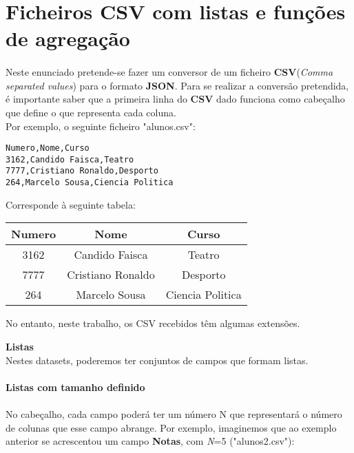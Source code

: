 \documentclass[11pt,a4paper]{report}
\begin{document}
    \section{Ficheiros CSV com listas e funções de agregação}
    \paragraph{}
    Neste enunciado pretende-se fazer um conversor de um ficheiro \textbf{CSV}(\textit{Comma separated values}) para o formato \textbf{JSON}. Para se realizar a conversão pretendida, é importante saber que a primeira linha do \textbf{CSV} dado funciona como cabeçalho que define o que representa cada coluna.\\
    Por exemplo, o seguinte ficheiro "alunos.csv":
    \begin{lstlisting}[]
Numero,Nome,Curso
3162,Candido Faisca,Teatro
7777,Cristiano Ronaldo,Desporto
264,Marcelo Sousa,Ciencia Politica
    \end{lstlisting}
    Corresponde à seguinte tabela:
\begin{center}
    \begin{tabular}{||c c c||} 
    \hline
    Numero & Nome & Curso \\ [0.5ex] 
    \hline
    3162 & Candido Faisca & Teatro \\ 
    \hline
    7777 & Cristiano Ronaldo & Desporto \\
    \hline
    264 & Marcelo Sousa & Ciencia Politica \\
    [1ex] 
    \hline
    \end{tabular}
\end{center}

\item No entanto, neste trabalho, os CSV recebidos têm algumas extensões.\\

    \item \textbf{Listas}\\
    Nestes datasets, poderemos ter conjuntos de campos que formam listas. \\ \\
    \textbf{Listas com tamanho definido} 
    \paragraph{}
    No cabeçalho, cada campo poderá ter um número N que representará o número de colunas que esse campo abrange. Por exemplo, imaginemos que ao exemplo anterior se acrescentou um campo \textbf{Notas}, com \textit{N}=5 ("alunos2.csv"):
\end{document}
